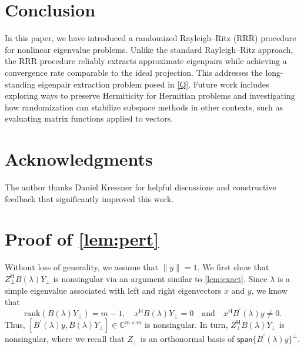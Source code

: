 \documentclass[a4paper,11pt]{article}
\newcommand{\Htran}{\mathsf{H}}
\newcommand{\C}{\mathbb{C}}
\newcommand{\rk}{\mathrm{rank}}
\providecommand{\spa}[1]{\mathsf{span}\{#1\}}
\providecommand{\norm}[1]{\lVert#1\rVert}
\begin{document}
\section{Conclusion}





In this paper, we have introduced a randomized Rayleigh--Ritz (RRR) procedure for nonlinear eigenvalue problems.
Unlike the standard Rayleigh--Ritz approach, the RRR procedure reliably extracts approximate eigenpairs while achieving a convergence rate comparable to the ideal projection.
This addresses the long-standing eigenpair extraction problem posed in \cref{Q}.
Future work includes exploring ways to preserve Hermiticity for Hermitian problems and investigating how randomization can stabilize subspace methods in other contexts, such as evaluating matrix functions applied to vectors.

\section*{Acknowledgments}
The author thanks Daniel Kressner for helpful discussions and constructive feedback that significantly improved this work. 
\appendix

\section{Proof of \cref{lem:pert}}

\label{app:pfpert}
    Without loss of generality, we assume that $\norm{y}=1$.
    We first show that $Z_{\perp}^{\Htran}B(\lambda)Y_{\perp}$ is nonsingular via an argument similar to \cref{lem:exact}.
    Since $\lambda$ is a simple eigenvalue associated with left and right eigenvectors $x$ and $y$, we know that 
    \begin{equation*}
        \rk(B(\lambda)Y_{\perp}) = m-1,\quad x^{\Htran}B(\lambda)Y_{\perp}=0
        \quad\text{and}\quad x^{\Htran}B^{\prime}(\lambda)y\neq 0.
    \end{equation*}
    Thus, $[B^{\prime}(\lambda)y,B(\lambda)Y_{\perp}]\in\C^{m\times m}$ is nonsingular. In turn, $Z_{\perp}^{\Htran}B(\lambda)Y_{\perp}$ is nonsingular, where we recall that $Z_{\perp}$ is an orthonormal basis of $\spa{B^{\prime}(\lambda)y}^{\perp}$.
\end{document}
